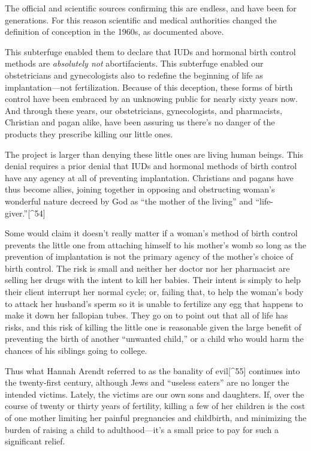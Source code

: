 \documentclass[
]{book}
\begin{document}
The official and scientific sources confirming this are endless, and have been for generations. For this reason scientific and medical authorities changed the definition of conception in the 1960s, as documented above.

This subterfuge enabled them to declare that IUDs and hormonal birth control methods are \emph{absolutely not} abortifacients. This subterfuge enabled our obstetricians and gynecologists also to redefine the beginning of life as implantation---not fertilization. Because of this deception, these forms of birth control have been embraced by an unknowing public for nearly sixty years now. And through these years, our obstetricians, gynecologists, and pharmacists, Christian and pagan alike, have been assuring us there's no danger of the products they prescribe killing our little ones.

The project is larger than denying these little ones are living human beings. This denial requires a prior denial that IUDs and hormonal methods of birth control have any agency at all of preventing implantation. Christians and pagans have thus become allies, joining together in opposing and obstructing woman's wonderful nature decreed by God as ``the mother of the living'' and ``life-giver.''{[}\^{}54{]}

Some would claim it doesn't really matter if a woman's method of birth control prevents the little one from attaching himself to his mother's womb so long as the prevention of implantation is not the primary agency of the mother's choice of birth control. The risk is small and neither her doctor nor her pharmacist are selling her drugs with the intent to kill her babies. Their intent is simply to help their client interrupt her normal cycle; or, failing that, to help the woman's body to attack her husband's sperm so it is unable to fertilize any egg that happens to make it down her fallopian tubes. They go on to point out that all of life has risks, and this risk of killing the little one is reasonable given the large benefit of preventing the birth of another ``unwanted child,'' or a child who would harm the chances of his siblings going to college.

Thus what Hannah Arendt referred to as the banality of evil{[}\^{}55{]} continues into the twenty-first century, although Jews and ``useless eaters'' are no longer the intended victims. Lately, the victims are our own sons and daughters. If, over the course of twenty or thirty years of fertility, killing a few of her children is the cost of one mother limiting her painful pregnancies and childbirth, and minimizing the burden of raising a child to adulthood---it's a small price to pay for such a significant relief.
\end{document}
